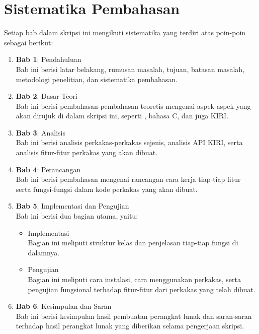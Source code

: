 \section{Sistematika Pembahasan}
\label{sec:sispem}
Setiap bab dalam skripsi ini mengikuti sistematika yang terdiri atas poin-poin sebagai berikut:
\begin{enumerate}
	\item \textbf{Bab 1}: Pendahuluan \\
	Bab ini berisi latar belakang, rumusan masalah, tujuan, batasan masalah, metodologi \mbox{penelitian}, dan sistematika pembahasan.
	\item \textbf{Bab 2}: Dasar Teori \\
	Bab ini berisi pembahasan-pembahasan teoretis mengenai aspek-aspek yang akan dirujuk di dalam skripsi ini, seperti \cl, bahasa C, dan juga KIRI.
	\item \textbf{Bab 3}: Analisis \\
	Bab ini berisi analisis perkakas-perkakas sejenis, analisis API KIRI, serta analisis fitur-fitur perkakas yang akan dibuat.
	\item \textbf{Bab 4}: Perancangan \\
	Bab ini berisi pembahasan mengenai rancangan cara kerja tiap-tiap fitur serta fungsi-fungsi dalam kode perkakas yang akan dibuat.
	\item \textbf{Bab 5}: Implementasi dan Pengujian \\
	Bab ini berisi dua bagian utama, yaitu:
	
	\begin{itemize}
		\item Implementasi \\
		Bagian ini meliputi struktur kelas dan penjelasan tiap-tiap fungsi di dalamnya.
		\item Pengujian \\
		Bagian ini meliputi cara instalasi, cara menggunakan perkakas, serta pengujian fungsional terhadap fitur-fitur dari perkakas yang telah dibuat.
	\end{itemize}
	
	\item \textbf{Bab 6}: Kesimpulan dan Saran \\
	Bab ini berisi kesimpulan hasil pembuatan perangkat lunak dan saran-saran terhadap hasil perangkat lunak yang diberikan selama pengerjaan skripsi.
\end{enumerate}